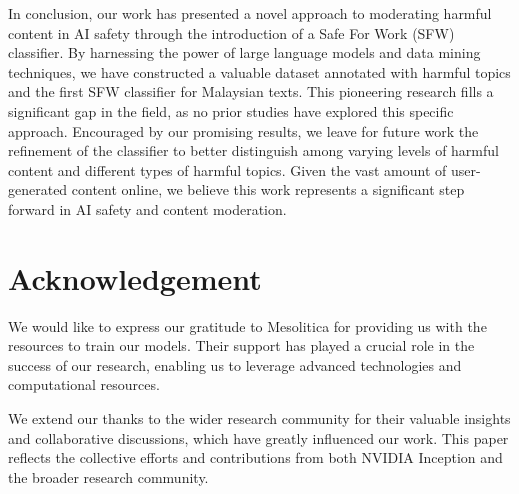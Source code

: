 \documentclass[preprint]{article}
\begin{document}
In conclusion, our work has presented a novel approach to moderating harmful content in AI safety through the introduction of a Safe For Work (SFW) classifier. By harnessing the power of large language models and data mining techniques, we have constructed a valuable dataset annotated with harmful topics and the first SFW classifier for Malaysian texts. This pioneering research fills a significant gap in the field, as no prior studies have explored this specific approach. Encouraged by our promising results, we leave for future work the refinement of the classifier to better distinguish among varying levels of harmful content and different types of harmful topics. Given the vast amount of user-generated content online, we believe this work represents a significant step forward in AI safety and content moderation.

\section{Acknowledgement}

We would like to express our gratitude to Mesolitica for providing us with the resources to train our models. Their support has played a crucial role in the success of our research, enabling us to leverage advanced technologies and computational resources.

We extend our thanks to the wider research community for their valuable insights and collaborative discussions, which have greatly influenced our work. This paper reflects the collective efforts and contributions from both NVIDIA Inception and the broader research community.

{}

\end{document}
